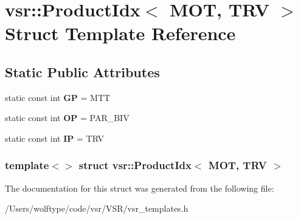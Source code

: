 \hypertarget{structvsr_1_1_product_idx_3_01_m_o_t_00_01_t_r_v_01_4}{\section{vsr\-:\-:Product\-Idx$<$ M\-O\-T, T\-R\-V $>$ Struct Template Reference}
\label{structvsr_1_1_product_idx_3_01_m_o_t_00_01_t_r_v_01_4}
}
\subsection*{Static Public Attributes}
\begin{DoxyCompactItemize}
\item 
\hypertarget{structvsr_1_1_product_idx_3_01_m_o_t_00_01_t_r_v_01_4_a3a72008e491d60da833b2edfdad49cd4}{static const int {\bfseries G\-P} = M\-T\-T}\label{structvsr_1_1_product_idx_3_01_m_o_t_00_01_t_r_v_01_4_a3a72008e491d60da833b2edfdad49cd4}

\item 
\hypertarget{structvsr_1_1_product_idx_3_01_m_o_t_00_01_t_r_v_01_4_a4563f27719f01189df8b39718b2f6130}{static const int {\bfseries O\-P} = P\-A\-R\-\_\-\-B\-I\-V}\label{structvsr_1_1_product_idx_3_01_m_o_t_00_01_t_r_v_01_4_a4563f27719f01189df8b39718b2f6130}

\item 
\hypertarget{structvsr_1_1_product_idx_3_01_m_o_t_00_01_t_r_v_01_4_a1ba7d7fa01ecda95b07ef07d18cb8aef}{static const int {\bfseries I\-P} = T\-R\-V}\label{structvsr_1_1_product_idx_3_01_m_o_t_00_01_t_r_v_01_4_a1ba7d7fa01ecda95b07ef07d18cb8aef}

\end{DoxyCompactItemize}
\subsubsection*{template$<$$>$ struct vsr\-::\-Product\-Idx$<$ M\-O\-T, T\-R\-V $>$}



The documentation for this struct was generated from the following file\-:\begin{DoxyCompactItemize}
\item 
/\-Users/wolftype/code/vsr/\-V\-S\-R/vsr\-\_\-templates.\-h\end{DoxyCompactItemize}
